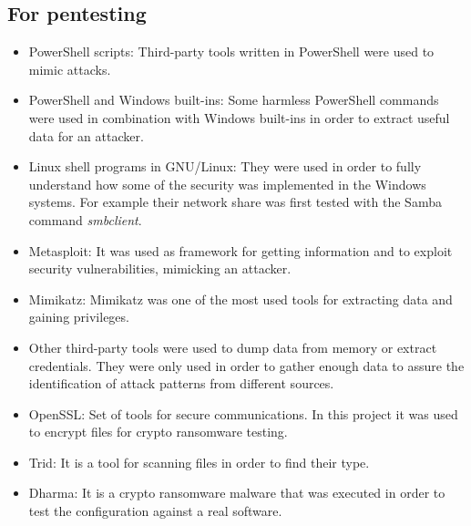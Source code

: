 \subsection{For pentesting}
\begin{itemize}
	\item PowerShell scripts: Third-party tools written in PowerShell were used to mimic attacks.
	\item PowerShell and Windows built-ins: Some harmless PowerShell commands were used in combination with Windows built-ins in order to extract useful data for an attacker.
	\item Linux shell programs in GNU/Linux: They were used in order to fully understand how some of the security was implemented in the Windows systems. For example their network share was first tested with the Samba command \textit{smbclient}.
	\item Metasploit: It was used as framework\cite{metasploit} for getting information and to exploit security vulnerabilities, mimicking an attacker.
	\item Mimikatz: Mimikatz\cite{mimikatz_github} was one of the most used tools for extracting data and gaining privileges.
	\item Other third-party tools were used to dump data from memory or extract credentials. They were only used in order to gather enough data to assure the identification of attack patterns from different sources.
	\item OpenSSL\cite{openssl}: Set of tools for secure communications. In this project it was used to encrypt files for crypto ransomware testing.
	\item Trid\cite{trid}: It is a tool for scanning files in order to find their type.
	\item Dharma\cite{dharma}: It is a crypto ransomware malware that was executed in order to test the configuration against a real software.
\end{itemize}

